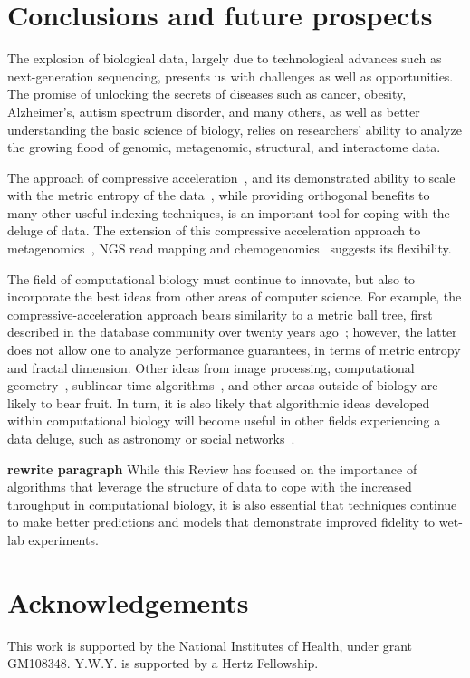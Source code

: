 \documentclass{acm_proc_article-sp}
\begin{document}
\section{Conclusions and future prospects}

The explosion of biological data, largely due to technological advances such as
next-generation sequencing, presents us with challenges as well as 
opportunities.
The promise of unlocking the secrets of diseases such as cancer, obesity,
Alzheimer's, autism spectrum disorder, and many others, as well as better 
understanding the basic science of biology, relies on researchers' ability to 
analyze the growing flood of genomic, metagenomic, structural, and interactome 
data.

The approach of compressive acceleration~\cite{loh2012compressive}, and its 
demonstrated ability to scale with the metric entropy of the 
data~\cite{yu2015entropy}, while providing orthogonal benefits to many other
useful indexing techniques, is an important tool for coping with the deluge of
data.
The extension of this compressive acceleration approach to 
metagenomics~\cite{yu2015entropy}, NGS read 
mapping and chemogenomics~\cite{yorukoglu2015compressive} suggests its 
flexibility.

The field of computational biology must continue to innovate, but also to 
incorporate the best ideas from other areas of computer science.
For example, the compressive-acceleration approach bears similarity to a metric 
ball tree, first described in the database community over twenty years 
ago~\cite{uhlmann1991satisfying};
however, the latter does not allow one to analyze performance guarantees, 
in terms of metric entropy and fractal dimension.
Other ideas from image processing, computational geometry~\cite{indyk1998approximate}, sublinear-time algorithms~\cite{rubinfeld2011sublinear}, and other areas 
outside of biology are likely to bear fruit. 
In turn, it is also likely that algorithmic ideas developed within computational biology
will become useful in other fields experiencing a data deluge, such as astronomy
or social networks~\cite{stephens2015big}.

\textbf{rewrite paragraph}
While this Review has focused on the importance of algorithms that leverage the
structure of data to cope with the increased throughput in computational 
biology, it is also essential that techniques continue to make better 
predictions and models that demonstrate improved fidelity to wet-lab 
experiments.

\section{Acknowledgements}
This work is supported by the National Institutes of Health, under
grant GM108348.
Y.W.Y. is supported by a Hertz Fellowship.






\end{document}
